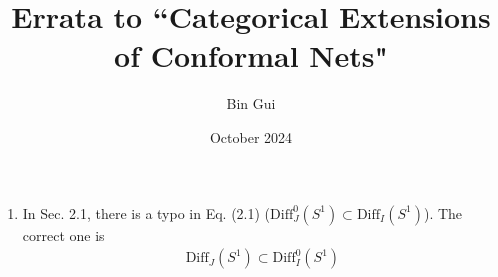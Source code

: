 \documentclass[11pt,b5paper,notitlepage]{article}
\title{Errata to ``Categorical Extensions of Conformal Nets"}
\author{Bin Gui}
\date{October 2024}
\begin{document}
\sloppy

\maketitle


\begin{enumerate}
\item In Sec. 2.1, there is a typo in Eq. (2.1) ($\mathrm{Diff}^0_J(S^1)\subset\mathrm{Diff}_I(S^1)$). The correct one is
\begin{align*}
\mathrm{Diff}_J(S^1)\subset\mathrm{Diff}^0_I(S^1)\tag{2.1}
\end{align*} 
\end{enumerate}
\end{document}
